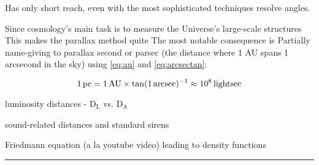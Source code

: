 Has only short reach, even with the most sophisticated techniques resolve angles.

Since cosmology's main task is to measure the Universe's large-scale structures
This makes the parallax method quite The most notable consequence is Partially
name-giving to parallax second or parsec (the distance where 1 AU spans 1
arcsecond in the sky) using \ref{eq:au} and \ref{eq:arcsectan}:

\begin{equation}
    1\,\parsec = 1\,\AU \times \tan(1\,\arcsec)^{-1} \approx 10^{8}\,\lightsec
    \eqlbl{parsec}
\end{equation}


luminosity distances - $\text{D}_{\text{L}}$ vs. $\text{D}_{\text{A}}$

sound-related distances and standard sirens

Friedmann equation (a la youtube video) leading to density functions


\par\noindent\rule{\textwidth}{0.8pt}